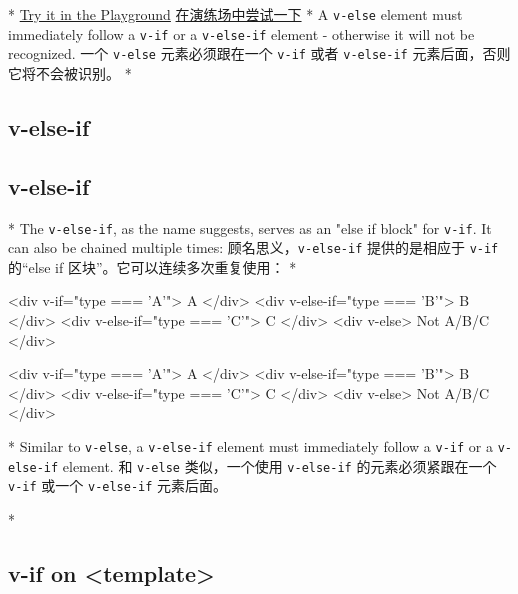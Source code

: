 \begin{paracol}{2}
\switchcolumn[0]*%
\href{https://play.vuejs.org/\#eNpFjkEOgjAQRa8ydIMulLA1hegJ3LnqBskAjdA27RQXhHu4M/GEHsEiKLv5mfdf/sBOxux7j+zAuCutNAQOyZtcKNkZbQkGsFjBCJXVHcQBjYUSqtTKERR3dLpDyCZmQ9bjViiezKKgCIGwM21BGBIAv3oireBYtrK8ZYKtgmg5BctJ13WLPJnhr0YQb1Lod7JaS4G8eATpfjMinjTphC8wtg7zcwNKw/v5eC1fnvwnsfEDwaha7w==}{Try
it in the Playground}
\switchcolumn
\href{https://play.vuejs.org/\#eNpFjkEOgjAQRa8ydIMulLA1hegJ3LnqBskAjdA27RQXhHu4M/GEHsEiKLv5mfdf/sBOxux7j+zAuCutNAQOyZtcKNkZbQkGsFjBCJXVHcQBjYUSqtTKERR3dLpDyCZmQ9bjViiezKKgCIGwM21BGBIAv3oireBYtrK8ZYKtgmg5BctJ13WLPJnhr0YQb1Lod7JaS4G8eATpfjMinjTphC8wtg7zcwNKw/v5eC1fnvwnsfEDwaha7w==}{在演练场中尝试一下}
\switchcolumn[0]*%
A \texttt{v-else} element must immediately follow a \texttt{v-if} or a
\texttt{v-else-if} element - otherwise it will not be recognized.
\switchcolumn
一个 \texttt{v-else} 元素必须跟在一个 \texttt{v-if} 或者
\texttt{v-else-if} 元素后面，否则它将不会被识别。
\switchcolumn[0]*%
\subsection{v-else-if}
\switchcolumn
\subsection{v-else-if}
\switchcolumn[0]*%
The \texttt{v-else-if}, as the name suggests, serves as an "else if
block" for \texttt{v-if}. It can also be chained multiple times:
\switchcolumn
顾名思义，\texttt{v-else-if} 提供的是相应于 \texttt{v-if} 的``else if
区块''。它可以连续多次重复使用：
\switchcolumn[0]*%
\begin{codeHtml}
<div v-if="type === 'A'">
  A
</div>
<div v-else-if="type === 'B'">
  B
</div>
<div v-else-if="type === 'C'">
  C
</div>
<div v-else>
  Not A/B/C
</div>
\end{codeHtml}
\switchcolumn
\begin{codeHtml}
<div v-if="type === 'A'">
  A
</div>
<div v-else-if="type === 'B'">
  B
</div>
<div v-else-if="type === 'C'">
  C
</div>
<div v-else>
  Not A/B/C
</div>
\end{codeHtml}
\switchcolumn[0]*%
Similar to \texttt{v-else}, a \texttt{v-else-if} element must
immediately follow a \texttt{v-if} or a \texttt{v-else-if} element.
\switchcolumn
和 \texttt{v-else} 类似，一个使用 \texttt{v-else-if}
的元素必须紧跟在一个 \texttt{v-if} 或一个 \texttt{v-else-if} 元素后面。

\switchcolumn[0]*%
\subsection{v-if on \textless template\textgreater{}}
\switchcolumn

\end{paracol}
